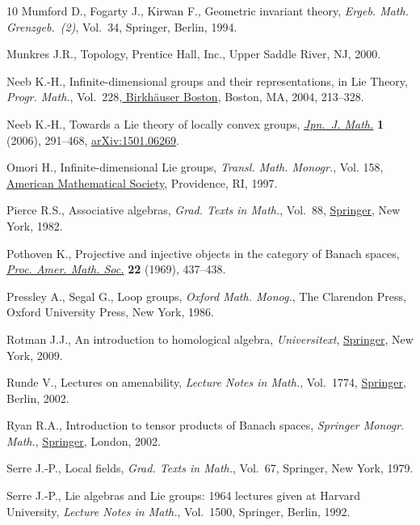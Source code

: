 \documentclass[10pt,a4paper]{amsart}
\numberwithin{equation}{section}
\begin{document}
\begin{thebibliography}{10}
Mumford D., Fogarty J., Kirwan F., Geometric invariant theory, \textit{Ergeb.
 Math. Grenzgeb.~(2)}, Vol.~34, Springer, Berlin, 1994.

Munkres J.R., Topology, Prentice Hall, Inc., Upper Saddle River, NJ, 2000.

Neeb K.-H., Infinite-dimensional groups and their representations, in Lie
 {T}heory, \textit{Progr. Math.}, Vol.~228,\href{https://doi.org/10.1007/978-0-8176-8192-0_2}{ Birkh\"auser Boston}, Boston, MA,
 2004, 213--328.

Neeb K.-H., Towards a {L}ie theory of locally convex groups, \href{https://doi.org/10.1007/s11537-006-0606-y}{\textit{Jpn.~J.
 Math.}} \textbf{1} (2006), 291--468, \href{https://arxiv.org/abs/1501.06269}{arXiv:1501.06269}.

Omori H., Infinite-dimensional {L}ie groups, \textit{Transl. Math. Monogr.},
 Vol. 158, \href{https://doi.org/10.1090/mmono/158}{American Mathematical Society}, Providence, RI, 1997.

Pierce R.S., Associative algebras, \textit{Grad. Texts in Math.}, Vol.~88,
 \href{https://doi.org/10.1007/978-1-4757-0163-0}{Springer}, New York, 1982.

Pothoven K., Projective and injective objects in the category of {B}anach
 spaces, \href{https://doi.org/10.2307/2037073}{\textit{Proc. Amer. Math. Soc.}} \textbf{22} (1969), 437--438.

Pressley A., Segal G., Loop groups, \textit{Oxford Math. Monog.}, The Clarendon Press,
 Oxford University Press, New York, 1986.

Rotman J.J., An introduction to homological algebra, \textit{Universitext}, \href{https://doi.org/10.1007/b98977}{Springer},
 New York, 2009.

Runde V., Lectures on amenability, \textit{Lecture Notes in Math.}, Vol.~1774,
 \href{https://doi.org/10.1007/b82937}{Springer}, Berlin, 2002.

Ryan R.A., Introduction to tensor products of {B}anach spaces, \textit{Springer Monogr.
 Math.}, \href{https://doi.org/10.1007/978-1-4471-3903-4}{Springer}, London, 2002.

Serre J.-P., Local fields, \textit{Grad. Texts in Math.}, Vol.~67, Springer, New
 York, 1979.

Serre J.-P., Lie algebras and {L}ie groups: 1964 lectures given at {H}arvard
 {U}niversity, \textit{Lecture Notes in Math.}, Vol.~1500, Springer, Berlin,
 1992.


\end{thebibliography}
\end{document}
